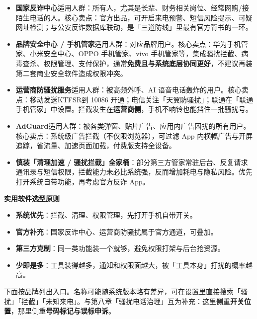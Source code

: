 
\begin{itemize}
  \item \textbf{国家反诈中心}适用人群：所有人，尤其是长辈、财务相关岗位、经常网购/接陌生电话的人。核心卖点：官方出品，可开启来电预警、短信风险提示、可疑网址检测；与公安反诈数据库联动，是「三道防线」里最有官方背书的一环。
  \item \textbf{品牌安全中心 / 手机管家}适用人群：对应品牌用户。核心卖点：华为手机管家、小米安全中心、OPPO 手机管家、vivo 手机管家等，集成骚扰拦截、病毒查杀、权限管理、支付保护，通常\textbf{免费且与系统底层协同更好}，不建议再装第二套商业安全软件造成权限冲突。
  \item \textbf{运营商防骚扰服务}适用人群：被高频外呼、AI 语音电话轰炸的用户。核心卖点：移动发送KTFSR到 10086 开通；电信关注「天翼防骚扰」；联通在「联通手机管家」中设置。拦截发生在\textbf{运营商侧}，手机不响铃也能挡住一批骚扰号。
  \item \textbf{AdGuard}适用人群：被各类弹窗、贴片广告、应用内广告困扰的所有用户。核心卖点：系统级广告拦截（不仅限浏览器），可过滤 App 内横幅广告与开屏追踪，省流量、加速页面加载，付费版支持全设备。
  \item \textbf{慎装「清理加速 / 骚扰拦截」全家桶}：部分第三方管家常驻后台、反复请求通讯录与短信权限，拦截能力未必比系统强，反而增加耗电与隐私风险。优先打开系统自带功能，再考虑官方反诈 App。
\end{itemize}

\textbf{实用软件选型原则}\par

\begin{itemize}
  \item \textbf{系统优先}：拦截、清理、权限管理，先打开手机自带开关。
  \item \textbf{官方补充}：国家反诈中心、运营商防骚扰属于官方通道，可叠加。
  \item \textbf{第三方克制}：同一类功能装一个就够，避免权限打架与后台抢资源。
  \item \textbf{少即是多}：工具装得越多，通知和权限面越大，被「工具本身」打扰的概率越高。
\end{itemize}


下面按品牌列出入口。名称可能随系统版本略有差异，可在设置里直接搜索「骚扰」「拦截」「未知来电」。与第八章「骚扰电话治理」互为补充：这里侧重\textbf{开关位置}，那里侧重\textbf{号码标记与误标申诉}。

